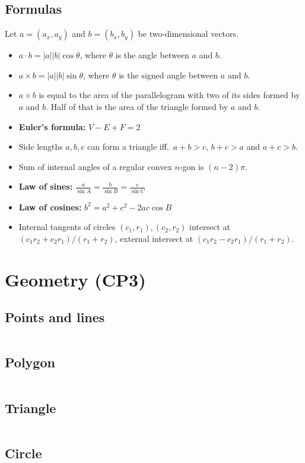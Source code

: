 \documentclass[8pt,a4paper,landscape,oneside]{amsart}
\newcommand{\mintedstyle}[2]{\inputminted[fontsize=\normalsize,baselinestretch=.9,breaklines,tabsize=2]{#1}{code/#2}}
\newcommand{\code}[1]{\mintedstyle{cpp}{#1}}
\newenvironment{myitemize}
{\begin{itemize}[leftmargin=.3cm]
	\setlength{\itemsep}{0pt}
	\setlength{\parskip}{0pt}
	\setlength{\parsep}{0pt}     }
{ \end{itemize}                  }
\begin{document}
\begin{multicols*}{3}
\subsection{Formulas}
Let $a = (a_x, a_y)$ and $b = (b_x, b_y)$ be two-dimensional vectors.
\begin{myitemize}
	\item $a\cdot b = |a||b|\cos{\theta}$, where $\theta$ is the angle
		between $a$ and $b$.
	\item $a\times b = |a||b|\sin{\theta}$, where $\theta$ is the
		signed angle between $a$ and $b$.
	\item $a\times b$ is equal to the area of the parallelogram with
		two of its sides formed by $a$ and $b$. Half of that is the
		area of the triangle formed by $a$ and $b$.
	\item \textbf{Euler's formula:} $V - E + F = 2$
	\item Side lengths $a,b,c$ can form a triangle iff.\ $a+b>c$, $b+c>a$ and $a+c>b$.
	\item Sum of internal angles of a regular convex $n$-gon is $(n-2)\pi$.
	\item \textbf{Law of sines:} $\frac{a}{\sin A} = \frac{b}{\sin B} = \frac{c}{\sin C}$
	\item \textbf{Law of cosines:} $b^2 = a^2 + c^2 - 2ac\cos B$
	\item Internal tangents of circles $(c_1,r_1), (c_2,r_2)$ intersect at $(c_1r_2+c_2r_1)/(r_1+r_2)$, external intersect at $(c_1r_2-c_2r_1)/(r_1+r_2)$.
\end{myitemize}

\section{Geometry (CP3)}
\subsection{Points and lines}
\code{geometry/CP/points_lines.cpp}
\subsection{Polygon}
\code{geometry/CP/polygon.cpp}
\subsection{Triangle}
\code{geometry/CP/triangles.cpp}
\subsection{Circle}
\code{geometry/CP/circles.cpp}



\end{multicols*}
\end{document}
